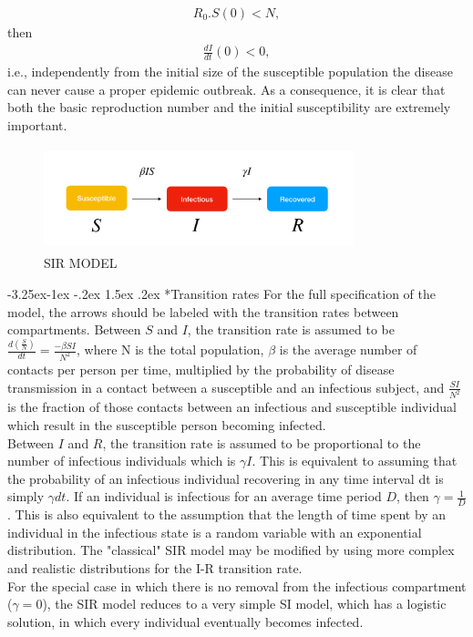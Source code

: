 \documentclass[a4paper]{article}
\makeatletter
\newcounter {subsubsubsection}[subsubsection]
\newcommand\subsubsubsection{\@startsection{subsubsubsection}{4}{\z@}%
                                     {-3.25ex\@plus -1ex \@minus -.2ex}%
                                     {1.5ex \@plus .2ex}%
                                     {\normalfont\normalsize\bfseries}}
\makeatother
\begin{document}
        \begin{align*}
            R_0 . S(0) < N,
        \end{align*}
        then 
        \begin{align*}
            \frac{dI}{dt}(0) < 0,
        \end{align*}
        i.e., independently from the initial size of the susceptible population the disease can never cause a proper epidemic outbreak. As a consequence, it is clear that both the basic reproduction number and the initial susceptibility are extremely important.
        \begin{figure}[h]
        \includegraphics[width=9cm, height=3cm, center]{Images/sir.png}
        \caption{SIR MODEL}
        \label{fig:sir}
    \end{figure}
        \subsubsubsection*{Transition rates}
        \indent For the full specification of the model, the arrows should be labeled with the transition rates between compartments. Between $S$ and $I$, the transition rate is assumed to be $\frac{d(\frac{S}{N})}{dt} = \frac{- \beta SI}{N^2}$, where N is the total population, $\beta$ is the average number of contacts per person per time, multiplied by the probability of disease transmission in a contact between a susceptible and an infectious subject, and $\frac{SI}{N^2}$ is the fraction of those contacts between an infectious and susceptible individual which result in the susceptible person becoming infected. \\
        \indent Between $I$ and $R$, the transition rate is assumed to be proportional to the number of infectious individuals which is $\gamma I$. This is equivalent to assuming that the probability of an infectious individual recovering in any time interval dt is simply $\gamma dt$. If an individual is infectious for an average time period $D$, then $\gamma = \frac{1}{D}$. This is also equivalent to the assumption that the length of time spent by an individual in the infectious state is a random variable with an exponential distribution. The "classical" SIR model may be modified by using more complex and realistic distributions for the I-R transition rate.\\
        \indent For the special case in which there is no removal from the infectious compartment ($\gamma =0$), the SIR model reduces to a very simple SI model, which has a logistic solution, in which every individual eventually becomes infected.
        
\end{document}
